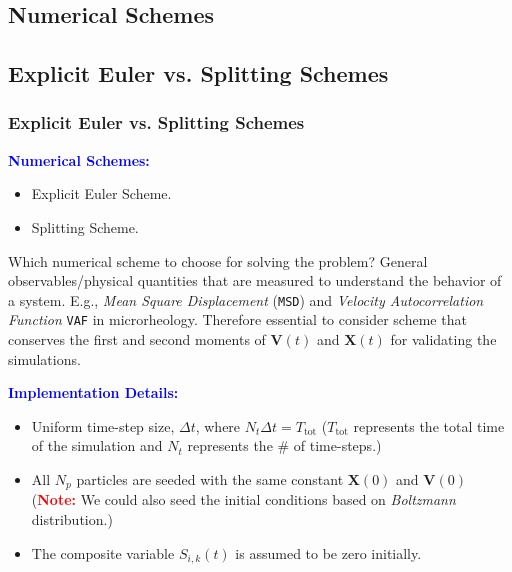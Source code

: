 \documentclass[a4paper,10pt]{beamer}
\newcommand{\BS}[1]{\boldsymbol{#1}}
\begin{document}
	\begin{frame}
		\section{Numerical Schemes}
		\subsection{Explicit Euler vs. Splitting Schemes}
		\frametitle{Explicit Euler vs. Splitting Schemes}
		\footnotesize
		\textcolor{blue}{\textbf{Numerical Schemes:}}
		\begin{itemize}
			\item {Explicit Euler Scheme.}
			\item {Splitting Scheme.}
		\end{itemize}
		\begin{alertblock}{Which numerical scheme to choose for solving the problem?}
			General observables/physical quantities that are measured to understand the behavior of a system. E.g., \textit{Mean Square Displacement} (\texttt{MSD}) and \textit{Velocity Autocorrelation Function} \texttt{VAF} in microrheology. Therefore essential to consider scheme that conserves the first and second moments of $\BS{V}(t)$ and $\BS{X}(t)$ for validating the simulations.
		\end{alertblock}
		\textcolor{blue}{\textbf{Implementation Details:}}
		\begin{itemize}
			\item {Uniform time-step size, $\Delta t$, where $N_{t} \Delta t = T_{\text{tot}}$ ($T_{\text{tot}}$ represents the total time of the simulation and $N_{t}$ represents the \# of time-steps.)}
			\item {All $N_{p}$ particles are seeded with the same constant $\BS{X}(0)$ and $\BS{V}(0)$ (\textcolor{red}{\textbf{Note:}} We could also seed the initial conditions based on \textit{Boltzmann} distribution.)}
			\item {The composite variable $S_{i,k}(t)$ is assumed to be zero initially.}
		\end{itemize}
	\end{frame}
	
\end{document}
